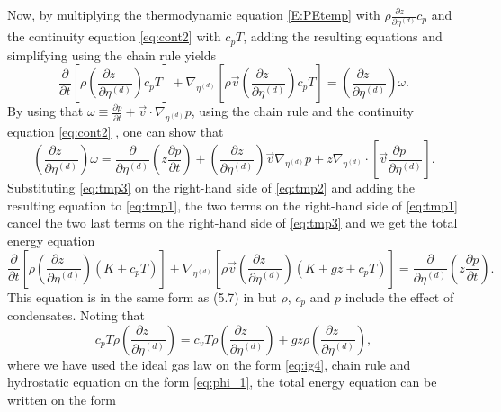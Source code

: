 \documentclass{agujournal}
\begin{document}
Now, by multiplying the thermodynamic equation \eqref{E:PEtemp} with $\rho \frac{\partial z\quad }{\partial \eta^{(d)}}c_p$ and the continuity equation \eqref{eq:cont2} with $c_p T$, adding the resulting equations and simplifying using the chain rule yields
\begin{equation}
\frac{\partial }{\partial t}\left[ \rho \left( \frac{\partial z\quad }{\partial \eta^{(d)}}\right)c_p T\right]+\nabla_{\eta^{(d)}} \left[ \rho \vec{v} \left( \frac{\partial z\quad }{\partial \eta^{(d)}}\right)c_p T\right]=\left( \frac{\partial z\quad}{\partial \eta^{(d)}}\right)\omega.\label{eq:tmp2}
\end{equation}
By using that $\omega\equiv \frac{\partial p}{\partial t}+\vec{v} \cdot \nabla_{\eta^{(d)}} p$, using the chain rule and the continuity equation \eqref{eq:cont2} , one can show that
\begin{equation}
\left( \frac{\partial z\quad}{\partial \eta^{(d)}}\right)\omega = \frac{\partial}{\partial \eta^{(d)}}\left( z\frac{\partial p}{\partial t}\right)+\left( \frac{\partial z}{\partial \eta^{(d)}}\right)\vec{v} \nabla_{\eta^{(d)}}p +z \nabla_{\eta^{(d)}}\cdot \left[ \vec{v} \frac{\partial p\quad }{\partial \eta^{(d)}}\right].\label{eq:tmp3}
\end{equation}
Substituting \eqref{eq:tmp3} on the right-hand side of \eqref{eq:tmp2} and adding the resulting equation to \eqref{eq:tmp1}, the two terms on the right-hand side of \eqref{eq:tmp1} cancel the two last terms on the right-hand side of \eqref{eq:tmp3} and we get the total energy equation
\begin{equation}
\frac{\partial }{\partial t}\left[ \rho \left( \frac{\partial z\quad }{\partial \eta^{(d)}}\right)\left(K+c_pT\right)\right]+\nabla_{\eta^{(d)}} \left[ \rho \vec{v} \left( \frac{\partial z\quad }{\partial \eta^{(d)}}\right) \left( K+gz+c_pT \right) \right]=\frac{\partial}{\partial \eta^{(d)}}\left( z\frac{\partial p}{\partial t}\right).\label{eq:Etotp}
\end{equation}
This equation is in the same form as (5.7) in \cite{K1974MWR} but $\rho$, $c_p$ and $p$ include the effect of condensates. Noting that
\begin{equation}
c_pT\rho \left( \frac{\partial z\quad }{\partial \eta^{(d)}}\right)=c_vT\rho \left( \frac{\partial z\quad }{\partial \eta^{(d)}}\right)+g z \rho \left( \frac{\partial z\quad }{\partial \eta^{(d)}}\right),
\end{equation}
where we have used the ideal gas law on the form \eqref{eq:ig4}, chain rule and hydrostatic equation on the form \eqref{eq:phi_1}, the total energy equation can be written on the form
\end{document}
